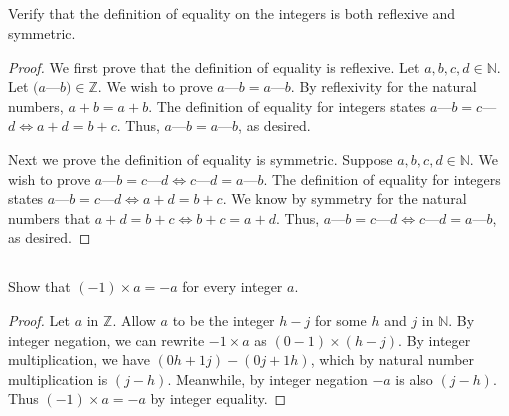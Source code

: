 \documentclass[../../main.tex]{subfiles}
\begin{document}

\subsection{}
\begin{q}
    Verify that the definition of equality on the integers is both reflexive and symmetric.
\end{q}
\begin{proof}
    We first prove that the definition of equality is reflexive.
    Let $a, b, c, d \in \mathbb{N}$.
    Let $(a$---$b) \in \mathbb{Z}$.
    We wish to prove $a$---$b = a$---$b$.
    By reflexivity for the natural numbers, $a + b = a + b$.
    The definition of equality for integers states $a$---$b = c$---$d \iff a + d = b + c$.
    Thus, $a$---$b = a$---$b$, as desired. 

    Next we prove the definition of equality is symmetric.
    Suppose $a, b, c, d \in \mathbb{N}$.
    We wish to prove $a$---$b = c$---$d \iff c$---$d = a$---$b$.
    The definition of equality for integers states $a$---$b = c$---$d \iff a + d = b + c$.
    We know by symmetry for the natural numbers that $a + d = b + c \iff b + c = a + d$.
    Thus, $a$---$b = c$---$d \iff c$---$d = a$---$b$, as desired.
\end{proof}

\addtocounter{subsection}{1}
\subsection{}
\begin{q}
    Show that $(-1) \times a = -a$ for every integer $a$.
\end{q}
\begin{proof}
    Let $a$ in $\mathbb{Z}$. Allow $a$ to be the integer $h-j$ for some $h$ and $j$ in $\mathbb{N}$. By integer negation, we can rewrite $-1 \times a$ as $(0-1) \times (h-j)$. By integer multiplication, we have $(0h + 1j) - (0j + 1h)$, which by natural number multiplication is $(j-h)$. Meanwhile, by integer negation $-a$ is also $(j-h)$. Thus $(-1) \times a = -a$ by integer equality. 
\end{proof}

\pagebreak
\end{document}
